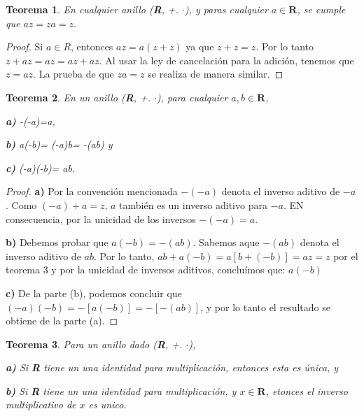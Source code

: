 \documentclass{llncs}
\theoremstyle{plane}
\newtheorem{teo}{Teorema}
\begin{document}
\begin{teo}
En cualquier anillo (\textbf{R}, +. $\cdot$), y paras cualquier $a \in \mathbf{R}$, se cumple que $az= za=z.$
\end{teo}


\begin{proof}
Si $a \in R$, entonces $az= a(z+z)$ ya que $z+z=z$. Por lo tanto $z+az= az= az+az.$
Al usar la ley de cancelación para la adición, tenemos que $z=az$.
La prueba de que $za=z$ se realiza de manera similar.
\end{proof}



\begin{teo}
En un anillo (\textbf{R}, +. $\cdot$), para cualquier $a , b \in \mathbf{R}$, 
\item [\textbf{a)}]  -(-a)=a,
\item [\textbf{b)}] a(-b)= (-a)b= -(ab) y
\item [\textbf{c)}] (-a)(-b)= ab.
\end{teo}

\begin{proof}
\item [\textbf{a)}]  Por la convención mencionada $-(-a)$ denota el inverso aditivo de $-a$. Como $(-a)+a=z$, $a$ también es un inverso aditivo para $-a$. EN consecuencia, por la unicidad de los inversos $-(-a)=a$.

\item [\textbf{b)}] Debemos probar que $a(-b)= -(ab)$. Sabemos aque $-(ab)$ denota el inverso aditivo de $ab$. Por lo tanto, $ab+ a(-b)= a[b+(-b)]= az= z$ por el teorema 3 y por la unicidad de inversos aditivos, concluímos que: $a(-b)$
\item [\textbf{c)}] De la parte (b), podemos concluir que $(-a)(-b)= -[a(-b)]= -[-(ab)]$, y por lo tanto el resultado se obtiene de la parte (a).
\end{proof}





\begin{teo}
Para un anillo dado (\textbf{R}, +. $\cdot$), 
\item [\textbf{a)}]  Si \textbf{R} tiene un una identidad para multiplicación, entonces esta es única, y
\item [\textbf{b)}]  Si \textbf{R} tiene un una identidad para multiplicación,  y $x \in \mathbf{R}$, etonces el inverso multiplicativo de $x$ es unico.
\end{teo}
\end{document}
